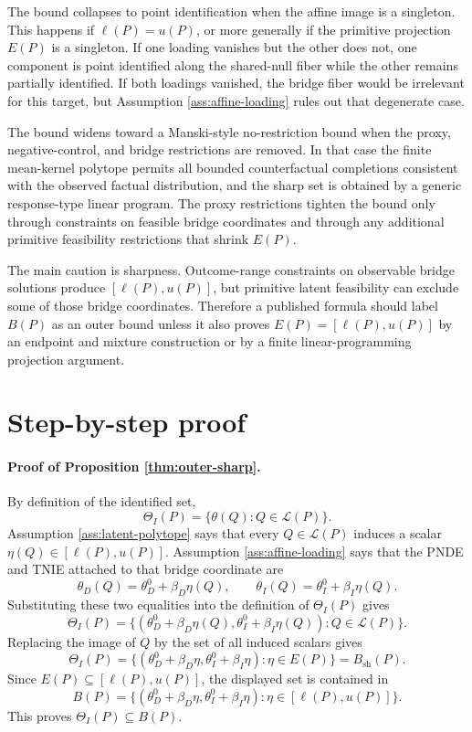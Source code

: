 \documentclass[11pt]{article}
\theoremstyle{definition}
\theoremstyle{plain}
\theoremstyle{remark}
\begin{document}
The bound collapses to point identification when the affine image is a
singleton.  This happens if \(\ell(P)=u(P)\), or more generally if the primitive
projection \(E(P)\) is a singleton.  If one loading vanishes but the other does
not, one component is point identified along the shared-null fiber while the
other remains partially identified.  If both loadings vanished, the bridge
fiber would be irrelevant for this target, but Assumption \ref{ass:affine-loading}
rules out that degenerate case.

The bound widens toward a Manski-style no-restriction bound when the proxy,
negative-control, and bridge restrictions are removed.  In that case the finite
mean-kernel polytope permits all bounded counterfactual completions consistent
with the observed factual distribution, and the sharp set is obtained by a
generic response-type linear program.  The proxy restrictions tighten the bound
only through constraints on feasible bridge coordinates and through any
additional primitive feasibility restrictions that shrink \(E(P)\).

The main caution is sharpness.  Outcome-range constraints on observable bridge
solutions produce \([\ell(P),u(P)]\), but primitive latent feasibility can
exclude some of those bridge coordinates.  Therefore a published formula should
label \(B(P)\) as an outer bound unless it also proves
\(E(P)=[\ell(P),u(P)]\) by an endpoint and mixture construction or by a finite
linear-programming projection argument.

\section{Step-by-step proof}
\paragraph{Proof of Proposition \ref{thm:outer-sharp}.}
By definition of the identified set,
\[
  \Theta_I(P)=\{\theta(Q):Q\in\mathcal L(P)\}.
\]
Assumption \ref{ass:latent-polytope} says that every \(Q\in\mathcal L(P)\)
induces a scalar \(\eta(Q)\in[\ell(P),u(P)]\).  Assumption
\ref{ass:affine-loading} says that the PNDE and TNIE attached to that bridge
coordinate are
\[
  \theta_D(Q)=\theta_D^0+\beta_D\eta(Q),
  \qquad
  \theta_I(Q)=\theta_I^0+\beta_I\eta(Q).
\]
Substituting these two equalities into the definition of \(\Theta_I(P)\) gives
\[
  \Theta_I(P)
  =\{(\theta_D^0+\beta_D\eta(Q),\theta_I^0+\beta_I\eta(Q)):
       Q\in\mathcal L(P)\}.
\]
Replacing the image of \(Q\) by the set of all induced scalars gives
\[
  \Theta_I(P)
  =\{(\theta_D^0+\beta_D\eta,\theta_I^0+\beta_I\eta):\eta\in E(P)\}
  =B_{\mathrm{sh}}(P).
\]
Since \(E(P)\subseteq[\ell(P),u(P)]\), the displayed set is contained in
\[
  B(P)=\{(\theta_D^0+\beta_D\eta,\theta_I^0+\beta_I\eta):
       \eta\in[\ell(P),u(P)]\}.
\]
This proves \(\Theta_I(P)\subseteq B(P)\).
\end{document}
